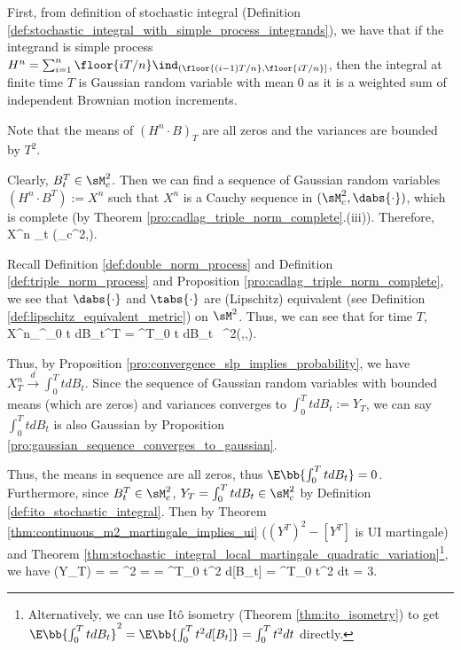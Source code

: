 \begin{solution}[\bf Solution]%
First, from definition of stochastic integral (Definition \ref{def:stochastic_integral_with_simple_process_integrands}),
we have that if the integrand is simple process $H^n = \sum^{n}_{i=1} \floor{iT/n}\ind_{(\floor{(i-1)T/n}, \floor{iT/n}]}$,
then the integral at finite time $T$ is Gaussian random variable with mean 0 as it is a weighted sum of independent Brownian motion increments.

Note that the means of $(H^n \cdot B)_T$ are all zeros and the variances are bounded by $T^2$.

Clearly, $B_t^T \in \sM_c^2$. Then we can find a sequence of Gaussian random variables $(H^n\cdot B^T) := X^n$ such that $X^n$ is a Cauchy sequence in $(\sM^2_c , \dabs{\cdot})$, which is complete (by Theorem \ref{pro:cadlag_triple_norm_complete}.(iii)). Therefore,
\be
X^n \to {}_{t} \quad {}(\sM_c^2,\dabs{\cdot}).
\ee

Recall Definition
\ref{def:double_norm_process} and Definition \ref{def:triple_norm_process} and Proposition \ref{pro:cadlag_triple_norm_complete}, we see that $\dabs{\cdot}$ and $\tabs{\cdot}$ are (Lipschitz) equivalent (see Definition
\ref{def:lipschitz_equivalent_metric}) on $\sM^2$. Thus, we can see that for time $T$, \be X^n_\infty \to \int^{\infty}_0 t dB_t^T = \int^T_0 t dB_t \ \sL^2(\Omega,\sF,\pro). \ee

Thus, by Proposition \ref{pro:convergence_slp_implies_probability}, we have $X^n_T \stackrel{d}{\to} \int^T_0 t dB_t$. Since the sequence of Gaussian random variables with bounded means (which are zeros) and variances
converges to $\int^T_0 t dB_t := Y_T$, we can say $\int^T_0 t dB_t$ is also Gaussian by Proposition \ref{pro:gaussian_sequence_converges_to_gaussian}.

Thus, the means in sequence are all zeros, thus $\E\bb{\int^T_0 t dB_t} = 0$. Furthermore, since $B_t^T \in \sM_c^2$, $Y_T = \int^T_0 t dB_t \in \sM_c^2$ by Definition \ref{def:ito_stochastic_integral}.
Then by Theorem \ref{thm:continuous_m2_martingale_implies_ui} ($(Y^T)^2 - [Y^T]$ is UI martingale) and Theorem \ref{thm:stochastic_integral_local_martingale_quadratic_variation}\footnote{Alternatively, we can use It\^o isometry (Theorem \ref{thm:ito_isometry}) to get $\E\bb{\int^T_0 t dB_t}^2 = \E\bb{\int^T_0 t^2 d[B_t]} = \int^T_0 t^2 dt$ directly.}, we have %
\be
\var(Y_T) = \var{} = \E{}^2 =  =  \int^T_0 t^2 d[B_t] = \int^T_0 t^2 dt = 3.
\ee


\end{solution}
